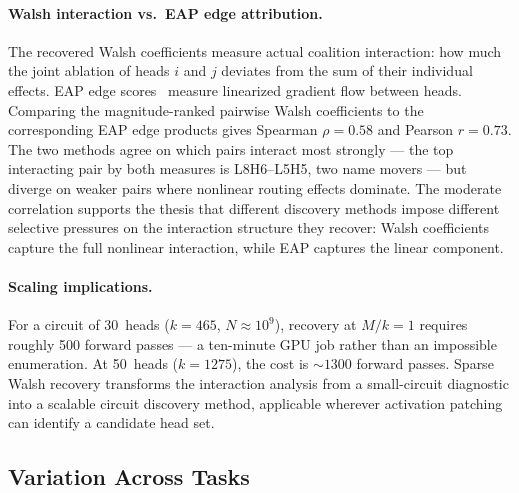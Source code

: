 \documentclass{article}
\begin{document}
\paragraph{Walsh interaction vs.\ EAP edge attribution.}

The recovered Walsh coefficients measure actual coalition interaction: how
much the joint ablation of heads $i$ and $j$ deviates from the sum of their
individual effects. EAP edge scores~\citep{syed2023attribution} measure
linearized gradient flow between heads. Comparing the magnitude-ranked
pairwise Walsh coefficients to the corresponding EAP edge products gives
Spearman $\rho = 0.58$ and Pearson $r = 0.73$. The two methods agree on
which pairs interact most strongly --- the top interacting pair by both
measures is L8H6--L5H5, two name movers --- but diverge on weaker pairs
where nonlinear routing effects dominate. The moderate correlation supports
the thesis that different discovery methods impose different selective
pressures on the interaction structure they recover: Walsh coefficients
capture the full nonlinear interaction, while EAP captures the linear
component.

\paragraph{Scaling implications.}

For a circuit of 30~heads ($k = 465$, $N \approx 10^9$), recovery at
$M/k = 1$ requires roughly 500 forward passes --- a ten-minute GPU job
rather than an impossible enumeration. At 50~heads ($k = 1275$), the
cost is ${\sim}1300$ forward passes. Sparse Walsh recovery transforms
the interaction analysis from a small-circuit diagnostic into a scalable
circuit discovery method, applicable wherever activation patching can
identify a candidate head set.


%
%

\subsection{Variation Across Tasks}
\label{sec:energy-spectrum}
\end{document}
